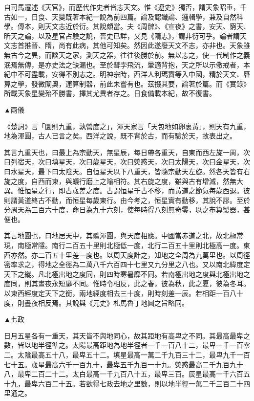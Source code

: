 
\begin{pinyinscope}
自司馬遷述《天官》，而歷代作史者皆志天文。惟《遼史》獨否，謂天象昭垂，千古如一，日食、天變既著本紀一說為前四篇。論及認識論、邏輯學，兼及自然科學。傳本，則天文志近於衍。其說頗當。夫《周髀》、《宣夜》之書，安天、窮天、昕天之論，以及星官占驗之說，晉史已詳，又見《隋志》，謂非衍可乎。論者謂天文志首推晉、隋，尚有此病，其他可知矣。然因此遂廢天文不志，亦非也。天象雖無古今之異，而談天之家，測天之器，往往後勝於前。無以志之，使一代制作之義泯焉無傳，是亦史法之缺漏也。至於彗孛飛流，暈適背抱，天之所以示儆戒者，本紀中不可盡載，安得不別志之。明神宗時，西洋人利瑪竇等入中國，精於天文、曆算之學，發微闡奧，運算制器，前此未嘗有也。茲掇其要，論著於篇。而《實錄》所載天象星變殆不勝書，擇其尤異者存之。日食備載本紀，故不復書。

▲兩儀

《楚詞》言「圜則九重，孰營度之」，渾天家言「天包地如卵裏黃」，則天有九重，地為渾圓，古人已言之矣。西洋之說，既不背於古，而有驗於天，故表出之。

其言九重天也，曰最上為宗動天，無星辰，每日帶各重天，自東而西左旋一周，次曰列宿天，次曰填星天，次曰歲星天，次曰熒惑天，次曰太陽天，次曰金星天，次曰水星天，最下曰太陰天。自恒星天以下八重天，皆隨宗動天左旋。然各天皆有右旋之度，自西而東，與蟻行磨上之喻相符。其右旋之度，雖與古有增減，然無大異。惟恒星之行，即古歲差之度。古謂恒星千古不移，而黃道之節氣每歲西退。彼則謂黃道終古不動，而恒星每歲東行。由今考之，恒星實有動移，其說不謬。至於分周天為三百六十度，命日為九十六刻，使每時得八刻無奇零，以之布算製器，甚便也。

其言地圓也，曰地居天中，其體渾圓，與天度相應。中國當赤道之北，故北極常現，南極常隱。南行二百五十里則北極低一度，北行二百五十里則北極高一度。東西亦然。亦二百五十里差一度也。以周天度計之，知地之全周為九萬里也。以周徑密率求之，得地之全徑為二萬八千六百四十七里又九分里之八也。又以南北緯度定天下之縱。凡北極出地之度同，則四時寒暑靡不同。若南極出地之度與北極出地之度同，則其晝夜永短靡不同。惟時令相反，此之春，彼為秋，此之夏，彼為冬耳。以東西經度定天下之衡，兩地經度相去三十度，則時刻差一辰。若相距一百八十度，則晝夜相反焉。其說與《元史》札馬魯丁地圓之旨略同。

▲七政

日月五星各有一重天，其天皆不與地同心，故其距地有高卑之不同。其最高最卑之數，皆以地半徑準之。太陽最高距地為地半徑者一千一百八十二，最卑一千一百零二。太陰最高五十八，最卑五十二。填星最高一萬二千九百三十二，最卑九千一百七十五。歲星最高六千一百九十，最卑五千九百一十九。熒惑最高二千九百九十八，最卑二百二十二。太白最高一千九百八十五，最卑三百。辰星最高一千六百五十九，最卑六百二十五。若欲得七政去地之里數，則以地半徑一萬二千三百二十四里通之。


\end{pinyinscope}
